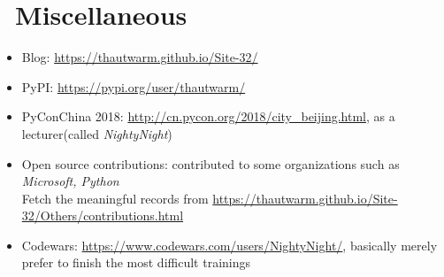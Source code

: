 \documentclass{resume}
\begin{document}
\section{\faInfo\ Miscellaneous}
\begin{itemize}[parsep=0.25ex]
  \item Blog: \url{https://thautwarm.github.io/Site-32/}
  \item PyPI: \url{https://pypi.org/user/thautwarm/}
  \item PyConChina 2018: \url{http://cn.pycon.org/2018/city_beijing.html}, as a lecturer(called \textit{NightyNight}) 
  \item Open source contributions: contributed to some organizations such as \textit{Microsoft, Python} \\
        Fetch the meaningful records from \url{https://thautwarm.github.io/Site-32/Others/contributions.html}
  \item Codewars: \url{https://www.codewars.com/users/NightyNight/}, basically merely prefer to finish the most difficult trainings
\end{itemize}

%
%
\end{document}
